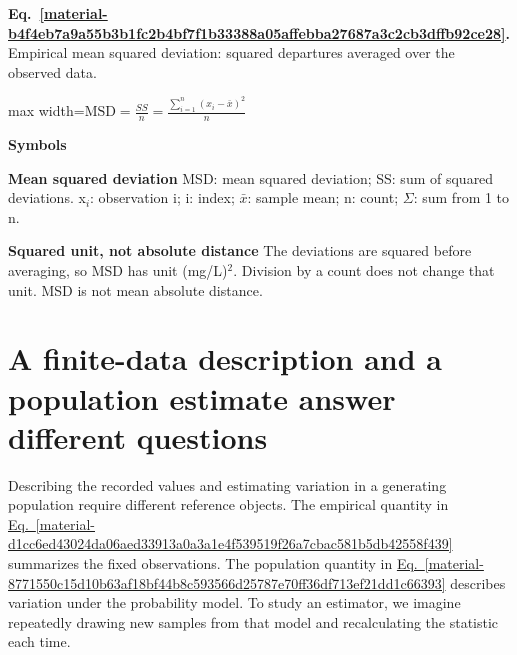 \documentclass[11pt,a4paper]{article}
\begin{document}
\par\medskip
\noindent\begin{minipage}{\linewidth}
\label{material-b4f4eb7a9a55b3b1fc2b4bf7f1b33388a05affebba27687a3c2cb3dffb92ce28}
\noindent\textbf{Eq.~\ref*{material-b4f4eb7a9a55b3b1fc2b4bf7f1b33388a05affebba27687a3c2cb3dffb92ce28}.} Empirical mean squared deviation: squared departures averaged over the observed data.\par\nopagebreak
\begin{center}\begin{adjustbox}{max width=\linewidth}$\displaystyle \mathrm{MSD}=\frac{SS}{n}=\frac{\sum_{i=1}^{n}(x_i-\bar{x})^2}{n}$\end{adjustbox}\end{center}

\par\noindent\textbf{Symbols}

\par\noindent\textbf{Mean squared deviation} MSD: mean squared deviation; SS: sum of squared deviations. x\ensuremath{{}_i}: observation i; i: index; \ensuremath{\bar{x}}: sample mean; n: count; \ensuremath{\Sigma}: sum from 1 to n.

\par\noindent\textbf{Squared unit, not absolute distance} The deviations are squared before averaging, so MSD has unit (mg/L)\ensuremath{{}^2}. Division by a count does not change that unit. MSD is not mean absolute distance.

\end{minipage}\par
\medskip

\clearpage
\section{A finite-data description and a population estimate answer different questions}
Describing the recorded values and estimating variation in a generating population require different reference objects. The empirical quantity in \hyperref[material-d1cc6ed43024da06aed33913a0a3a1e4f539519f26a7cbac581b5db42558f439]{Eq.~\ref*{material-d1cc6ed43024da06aed33913a0a3a1e4f539519f26a7cbac581b5db42558f439}} summarizes the fixed observations. The population quantity in \hyperref[material-8771550c15d10b63af18bf44b8c593566d25787e70ff36df713ef21dd1c66393]{Eq.~\ref*{material-8771550c15d10b63af18bf44b8c593566d25787e70ff36df713ef21dd1c66393}} describes variation under the probability model. To study an estimator, we imagine repeatedly drawing new samples from that model and recalculating the statistic each time.
\end{document}
